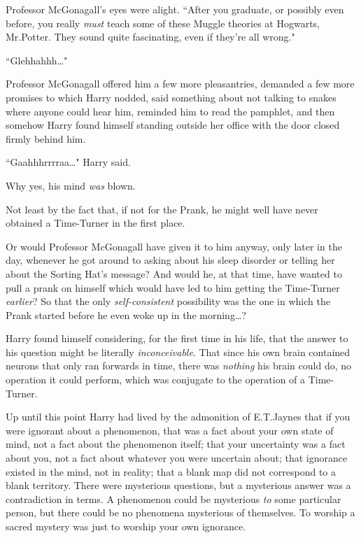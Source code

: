 Professor McGonagall's eyes were alight. ``After you graduate, or possibly even before, you really \emph{must} teach some of these Muggle theories at Hogwarts, Mr.\?Potter. They sound quite fascinating, even if they're all wrong."

``Glehhahhh{\ldots}"

Professor McGonagall offered him a few more pleasantries, demanded a few more promises to which Harry nodded, said something about not talking to snakes where anyone could hear him, reminded him to read the pamphlet, and then somehow Harry found himself standing outside her office with the door closed firmly behind him.

``Gaahhhrrrraa{\ldots}" Harry said.

Why yes, his mind \emph{was} blown.

Not least by the fact that, if not for the Prank, he might well have never obtained a Time-Turner in the first place.

Or would Professor McGonagall have given it to him anyway, only later in the day, whenever he got around to asking about his sleep disorder or telling her about the Sorting Hat's message? And would he, at that time, have wanted to pull a prank on himself which would have led to him getting the Time-Turner \emph{earlier}? So that the only \emph{self-consistent} possibility was the one in which the Prank started before he even woke up in the morning{\ldots}?

Harry found himself considering, for the first time in his life, that the answer to his question might be literally \emph{inconceivable}. That since his own brain contained neurons that only ran forwards in time, there was \emph{nothing} his brain could do, no operation it could perform, which was conjugate to the operation of a Time-Turner.

Up until this point Harry had lived by the admonition of E.\?T.\?Jaynes that if you were ignorant about a phenomenon, that was a fact about your own state of mind, not a fact about the phenomenon itself; that your uncertainty was a fact about you, not a fact about whatever you were uncertain about; that ignorance existed in the mind, not in reality; that a blank map did not correspond to a blank territory. There were mysterious questions, but a mysterious answer was a contradiction in terms. A phenomenon could be mysterious \emph{to} some particular person, but there could be no phenomena mysterious of themselves. To worship a sacred mystery was just to worship your own ignorance.


